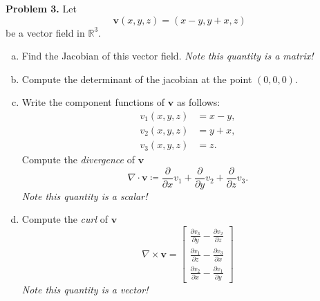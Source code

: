 \documentclass[12pt]{report} %
\newcommand{\R}{\mathbb{R}}
\theoremstyle{definition}
\begin{document}
\noindent\textbf{Problem 3.} Let
\[
\mathbf{v}(x,y,z)= ( x-y,y+x,z)
\]
be a vector field in $\R^3$.  
\begin{enumerate}[(a)]
    \item Find the Jacobian of this vector field. \emph{Note this quantity is a matrix!}
    \item Compute the determinant of the jacobian at the point $(0,0,0)$.  
    \item Write the component functions of $\mathbf{v}$ as follows:
    \begin{align*}
        v_1 (x,y,z) &= x-y,\\
        v_2(x,y,z) &= y+x,\\
        v_3(x,y,z) &= z.
    \end{align*}
    Compute the \emph{divergence} of $\mathbf{v}$
    \[
    \nabla \cdot \mathbf{v} \coloneqq \frac{\partial}{\partial x} v_1 + \frac{\partial}{\partial y} v_2 + \frac{\partial}{\partial z} v_3.
    \]
    \emph{Note this quantity is a scalar!}
    \item Compute the \emph{curl} of $\mathbf{v}$
    \[
    \nabla \times \mathbf{v} = \begin{bmatrix} \frac{\partial v_3}{\partial y} - \frac{\partial v_2}{\partial z} \\ \frac{\partial v_1}{\partial z} - \frac{\partial v_3}{\partial x} \\ \frac{\partial v_2}{\partial x} - \frac{\partial v_1}{\partial y} \end{bmatrix}
    \]
    \emph{Note this quantity is a vector!}
\end{enumerate}
\end{document}

